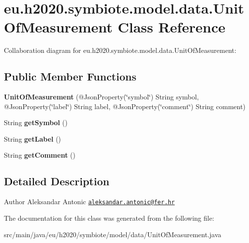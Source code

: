 \hypertarget{classeu_1_1h2020_1_1symbiote_1_1model_1_1data_1_1UnitOfMeasurement}{}\section{eu.\+h2020.\+symbiote.\+model.\+data.\+Unit\+Of\+Measurement Class Reference}
\label{classeu_1_1h2020_1_1symbiote_1_1model_1_1data_1_1UnitOfMeasurement}


Collaboration diagram for eu.\+h2020.\+symbiote.\+model.\+data.\+Unit\+Of\+Measurement\+:
\subsection*{Public Member Functions}
\begin{DoxyCompactItemize}
\item 
\mbox{\label{classeu_1_1h2020_1_1symbiote_1_1model_1_1data_1_1UnitOfMeasurement_a2e505bee2482b77b34a84ec46da7cdd5}} 
{\bfseries Unit\+Of\+Measurement} (@Json\+Property(\char`\"{}symbol\char`\"{}) String symbol, @Json\+Property(\char`\"{}label\char`\"{}) String label, @Json\+Property(\char`\"{}comment\char`\"{}) String comment)
\item 
\mbox{\label{classeu_1_1h2020_1_1symbiote_1_1model_1_1data_1_1UnitOfMeasurement_aadf318cff36292efcb893ae3e0dd007a}} 
String {\bfseries get\+Symbol} ()
\item 
\mbox{\label{classeu_1_1h2020_1_1symbiote_1_1model_1_1data_1_1UnitOfMeasurement_aeecbc2a3f709cb56f5fba4ca0b247197}} 
String {\bfseries get\+Label} ()
\item 
\mbox{\label{classeu_1_1h2020_1_1symbiote_1_1model_1_1data_1_1UnitOfMeasurement_a44eef74d6d1031d5f50327e00d6f726d}} 
String {\bfseries get\+Comment} ()
\end{DoxyCompactItemize}


\subsection{Detailed Description}
\begin{DoxyAuthor}{Author}
Aleksandar Antonic \href{mailto:aleksandar.antonic@fer.hr}{\tt aleksandar.\+antonic@fer.\+hr} 
\end{DoxyAuthor}


The documentation for this class was generated from the following file\+:\begin{DoxyCompactItemize}
\item 
src/main/java/eu/h2020/symbiote/model/data/Unit\+Of\+Measurement.\+java\end{DoxyCompactItemize}
